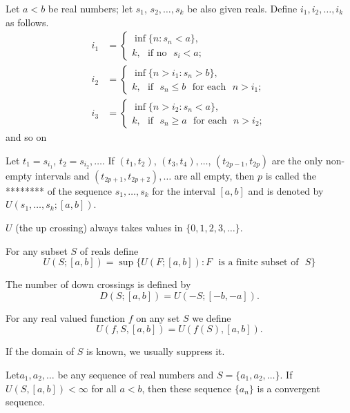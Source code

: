 \begin{defi*}
Let $a<b$ be real numbers; let $s_{1}$, $s_{2},\ldots,s_{k}$ be also
given reals. Define $i_{1},i_{2},\ldots,i_{k}$ as follows.
\begin{align*}
i_{1} &= 
\begin{cases}
\inf \{n:s_{n}<a\},\\
k, \text{~ if no~ } s_{i}<a;
\end{cases}\\[5pt]
i_{2} &= 
\begin{cases}
\inf \{n>i_{1}:s_{n}>b\},\\
k,\text{~ if~ } s_{n}\leq b\text{~ for each~ } n>i_{1};
\end{cases}\\[5pt]
i_{3} &= 
\begin{cases}
\inf \{n>i_{2}:s_{n}<a\},\\
k,\text{~ if~ } s_{n}\geq a\text{~ for each~ } n>i_{2};
\end{cases}
\end{align*}
and so on

Let $t_{1}=s_{i_{1}}$, $t_{2}=s_{i_{2}},\ldots$. If $(t_{1},t_{2})$,
$(t_{3},t_{4}),\ldots$, $(t_{2p-1},t_{2p})$ are the only non-empty
intervals and $(t_{2p+1},t_{2p+2}),\ldots$ are all empty, then $p$ is
called the ******** of the sequence $s_{1},\ldots,s_{k}$ for the
interval $[a,b]$ and is denoted by $U(s_{1},\ldots,s_{k};[a,b])$.
\end{defi*}

\begin{note*}
$U$ (the up crossing) always takes values in $\{0,1,2,3,\ldots\}$.
\end{note*}

\begin{defi*}
For any subset $S$ of reals define
$$
U(S;[a,b])=\sup \{U(F;[a,b]):F\text{~ is a finite subset of~ } S\}
$$

The number of down crossings is defined by
$$
D(S;[a,b])=U(-S;[-b,-a]).
$$

For any real valued function $f$ on any set $S$ we define
$$
U(f,S,[a,b])=U(f(S),[a,b]).
$$

If the domain of $S$ is known, we usually suppress it.
\end{defi*}


\begin{prop*}
Let\pageoriginale $a_{1},a_{2},\ldots$ be any sequence of real numbers
and $S=\{a_{1},a_{2},\ldots\}$. If $U(S,[a,b])<\infty$ for all $a<b$,
then these sequence $\{a_{n}\}$ is a convergent sequence.
\end{prop*}


